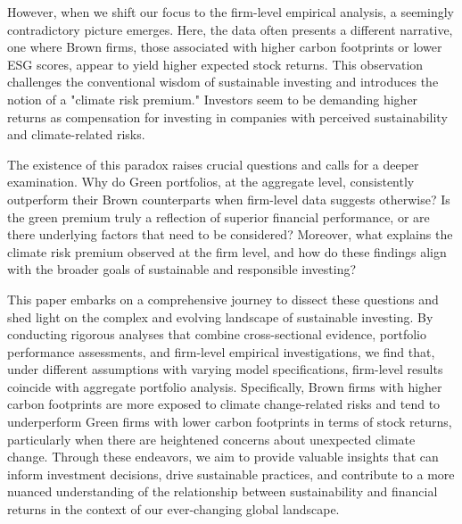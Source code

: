 \documentclass[12pt]{article}
\begin{document}
However, when we shift our focus to the firm-level empirical analysis, a seemingly contradictory picture emerges. Here, the data often presents a different narrative, one where Brown firms, those associated with higher carbon footprints or lower ESG scores, appear to yield higher expected stock returns. This observation challenges the conventional wisdom of sustainable investing and introduces the notion of a "climate risk premium." Investors seem to be demanding higher returns as compensation for investing in companies with perceived sustainability and climate-related risks.

The existence of this paradox raises crucial questions and calls for a deeper examination. Why do Green portfolios, at the aggregate level, consistently outperform their Brown counterparts when firm-level data suggests otherwise? Is the green premium truly a reflection of superior financial performance, or are there underlying factors that need to be considered? Moreover, what explains the climate risk premium observed at the firm level, and how do these findings align with the broader goals of sustainable and responsible investing?

This paper embarks on a comprehensive journey to dissect these questions and shed light on the complex and evolving landscape of sustainable investing. By conducting rigorous analyses that combine cross-sectional evidence, portfolio performance assessments, and firm-level empirical investigations, we find that, under different assumptions with varying model specifications, firm-level results coincide with aggregate portfolio analysis. Specifically, Brown firms with higher carbon footprints are more exposed to climate change-related risks and tend to underperform Green firms with lower carbon footprints in terms of stock returns, particularly when there are heightened concerns about unexpected climate change. Through these endeavors, we aim to provide valuable insights that can inform investment decisions, drive sustainable practices, and contribute to a more nuanced understanding of the relationship between sustainability and financial returns in the context of our ever-changing global landscape.
\clearpage
\begingroup
{}


\endgroup

\clearpage

\end{document}
